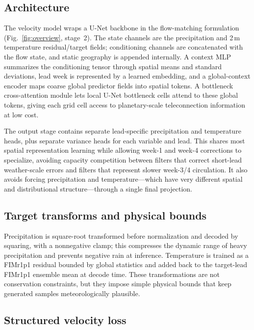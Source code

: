 \documentclass[11pt]{article}
\newcommand{\modelshort}{FIMr1p1}
\begin{document}
\subsection{Architecture}

The velocity model wraps a U-Net backbone \citep{Ronneberger2015} in the flow-matching formulation (Fig.~\ref{fig:overview}, stage~2). The state channels are the precipitation and 2\,m temperature residual/target fields; conditioning channels are concatenated with the flow state, and static geography is appended internally. A context MLP summarizes the conditioning tensor through spatial means and standard deviations, lead week is represented by a learned embedding, and a global-context encoder maps coarse global predictor fields into spatial tokens. A bottleneck cross-attention module lets local U-Net bottleneck cells attend to these global tokens, giving each grid cell access to planetary-scale teleconnection information at low cost.

The output stage contains separate lead-specific precipitation and temperature heads, plus separate variance heads for each variable and lead. This shares most spatial representation learning while allowing week-1 and week-4 corrections to specialize, avoiding capacity competition between filters that correct short-lead weather-scale errors and filters that represent slower week-3/4 circulation. It also avoids forcing precipitation and temperature---which have very different spatial and distributional structure---through a single final projection.

\subsection{Target transforms and physical bounds}

Precipitation is square-root transformed before normalization and decoded by squaring, with a nonnegative clamp; this compresses the dynamic range of heavy precipitation and prevents negative rain at inference. Temperature is trained as a \modelshort{} residual bounded by global statistics and added back to the target-lead \modelshort{} ensemble mean at decode time. These transformations are not conservation constraints, but they impose simple physical bounds that keep generated samples meteorologically plausible.

\subsection{Structured velocity loss}
\end{document}
